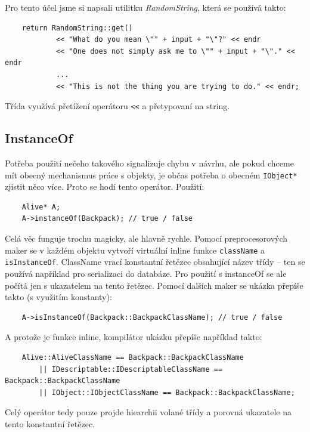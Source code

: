 \documentclass[11pt, a4paper]{article}
\def\class#1{\emph{#1}}
\begin{document}
\noindent Pro tento účel jsme si napsali utilitku \class{RandomString}, která se používá takto:

\begin{lstlisting}
	return RandomString::get()
		    << "What do you mean \"" + input + "\"?" << endr
		    << "One does not simply ask me to \"" + input + "\"." << endr
		    ...
			<< "This is not the thing you are trying to do." << endr;
\end{lstlisting}

\noindent Třída využívá přetížení operátoru \texttt{<<} a přetypovaní na string.

\subsection{InstanceOf}

Potřeba použití nečeho takového signalizuje chybu v návrhu, ale pokud chceme mít obecný mechanismus práce s objekty, je občas potřeba o obecném \texttt{IObject*} zjistit něco více. Proto se hodí tento operátor. Použití:

\begin{lstlisting}
	Alive* A;
	A->instanceOf(Backpack); // true / false
\end{lstlisting}

\noindent Celá věc funguje trochu magicky, ale hlavně rychle. Pomocí preprocesorových maker se v každém objektu vytvoří virtuální inline funkce \texttt{className} a \texttt{isInstanceOf}. ClassName vrací konstantní řetězec obsahující název třídy -- ten se používá například pro serializaci do databáze. Pro použití s instanceOf se ale počítá jen s ukazatelem na tento řetězec. Pomocí dalších maker se ukázka přepíše takto (s využitím konstanty):

\begin{lstlisting}
	A->isInstanceOf(Backpack::BackpackClassName); // true / false
\end{lstlisting}

\noindent A protože je funkce inline, kompilátor ukázku přepíše například takto:

\begin{lstlisting}
	Alive::AliveClassName == Backpack::BackpackClassName 
		|| IDescriptable::IDescriptableClassName == Backpack::BackpackClassName 
		|| IObject::IObjectClassName == Backpack::BackpackClassName;
\end{lstlisting}

\noindent Celý operátor tedy pouze projde hiearchii volané třídy a porovná ukazatele na tento konstantní řetězec.
\end{document}
